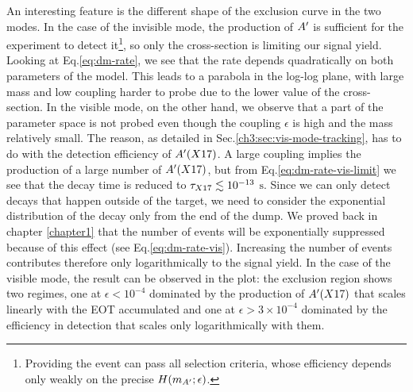 An interesting feature is the different shape of the exclusion curve in the two modes. In the case of the invisible mode, the production of $A'$ is sufficient for the experiment to detect it\footnote{Providing the event can pass all selection criteria, whose efficiency depends only weakly on the precise $H(m_{A'};\epsilon)$.}, so only the cross-section is limiting our signal yield. Looking at Eq.\ref{eq:dm-rate}, we see that the rate depends quadratically on both parameters of the model. This leads to a parabola in the log-log plane, with large mass and low coupling harder to probe due to the lower value of the cross-section. In the visible mode, on the other hand, we observe that a part of the parameter space is not probed even though the coupling $\epsilon$ is high and the mass relatively small. The reason, as detailed in Sec.\ref{ch3:sec:vis-mode-tracking}, has to do with the detection efficiency of $A'(X17)$. A large coupling implies the production of a large number of $A'(X17)$, but from Eq.\ref{eq:dm-rate-vis-limit} we see that the decay time is reduced to $\tau_{X17} \lesssim 10^{-13}$ $\si{\second}$. Since we can only detect decays that happen outside of the target, we need to consider the exponential distribution of the decay only from the end of the dump. We proved back in chapter \ref{chapter1} that the number of events will be exponentially suppressed because of this effect (see Eq.\ref{eq:dm-rate-vis}). Increasing the number of events contributes therefore only logarithmically to the signal yield. In the case of the visible mode, the result can be observed in the plot: the exclusion region shows two regimes, one at $\epsilon < 10^{-4}$ dominated by the production of $A'(X17)$ that scales linearly with the EOT accumulated and one at $\epsilon > 3 \times 10^{-4}$ dominated by the efficiency in detection that scales only logarithmically with them.

